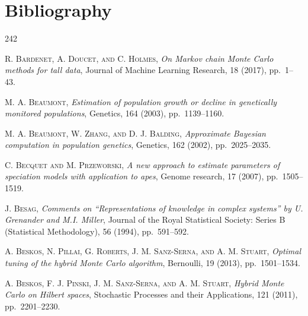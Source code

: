 \chapter*{Bibliography}

\begin{thebibliography}{242}

\leavevmode
{}\leavevmode
{}\leavevmode
{}\leavevmode
{}\leavevmode
{}\leavevmode
{}\leavevmode
{}\leavevmode
{}\leavevmode
{}\leavevmode
{}\leavevmode
{}\leavevmode
{}\leavevmode
{}\leavevmode
{}\leavevmode

\textsc{R. Bardenet, A. Doucet, and C. Holmes},
\textit{On Markov chain Monte Carlo methods for tall data},
Journal of Machine Learning Research, 18 (2017), pp.\ 1--43.

\textsc{M. A. Beaumont},
\textit{Estimation of population growth or decline in genetically monitored populations},
Genetics, 164 (2003), pp.\ 1139--1160.

\textsc{M. A. Beaumont, W. Zhang, and D. J. Balding},
\textit{Approximate Bayesian computation in population genetics},
Genetics, 162 (2002), pp.\ 2025--2035.

\textsc{C. Becquet and M. Przeworski},
\textit{A new approach to estimate parameters of speciation models with application to apes},
Genome research, 17 (2007), pp.\ 1505--1519.

\textsc{J. Besag},
\textit{Comments on ``Representations of knowledge in complex systems'' by U. Grenander and M.I. Miller},
Journal of the Royal Statistical Society: Series B (Statistical Methodology), 56 (1994), pp.\ 591--592.

\textsc{A. Beskos, N. Pillai, G. Roberts, J. M. Sanz-Serna, and A. M. Stuart},
\textit{Optimal tuning of the hybrid Monte Carlo algorithm},
Bernoulli, 19 (2013), pp.\ 1501--1534.

\textsc{A. Beskos, F. J. Pinski, J. M. Sanz-Serna, and A. M. Stuart},
\textit{Hybrid Monte Carlo on Hilbert spaces},
Stochastic Processes and their Applications, 121 (2011), pp.\ 2201--2230.


\end{thebibliography}
